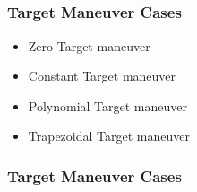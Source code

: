 \documentclass{beamer}
\begin{document}
\subsection{} 

\begin{frame}
\frametitle{Target Maneuver Cases}
\begin{itemize}
	\item Zero Target maneuver
	\item Constant Target maneuver
	\item Polynomial Target maneuver
	\item Trapezoidal Target maneuver
\end{itemize}
\end{frame}
\begin{frame}
\frametitle{Target Maneuver Cases}


\end{frame}
\end{document}
